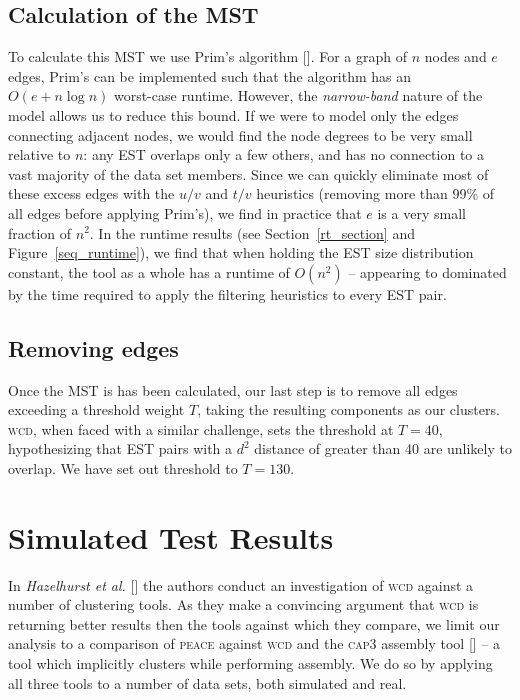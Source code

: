 \documentclass[a4paper,12pt]{article}
\begin{document}
\begin{appendix}
\subsection{Calculation of the MST}

To calculate this MST we use Prim's algorithm [\cite{Prim57}].  For a
graph of $n$ nodes and $e$ edges, Prim's can be implemented such that
the algorithm has an $O(e + n \log n)$ worst-case runtime.  However,
the {\it narrow-band} nature of the model allows us to reduce this
bound.  If we were to model only the edges connecting adjacent nodes,
we would find the node degrees to be very small relative to $n$: any
EST overlaps only a few others, and has no connection to a vast
majority of the data set members.  Since we can quickly eliminate most
of these excess edges with the $u/v$ and $t/v$ heuristics (removing
more than 99\% of all edges before applying Prim's), we find in
practice that $e$ is a very small fraction of $n^2$.  In the
runtime results (see Section~\ref{rt_section} and
Figure~\ref{seq_runtime}), we find that when holding the EST size
distribution constant, the tool as a whole has a runtime of $O(n^2)$
-- appearing to dominated by the time required to apply
the filtering heuristics to every EST pair.

\subsection{Removing edges}

Once the MST is has been calculated, our last step is to remove all
edges exceeding a threshold weight $T$, taking the resulting
components as our clusters.  \textsc{wcd}, when faced with a similar
challenge, sets the threshold at $T=40$, hypothesizing that EST pairs
with a $d^2$ distance of greater than 40 are unlikely to overlap.  We
have set out threshold to $T=130$.



\section{Simulated Test Results}

In {\it Hazelhurst et al.} [\cite{Hazelhurst08a}] the authors conduct
an investigation of \textsc{wcd} against a number of clustering
tools.  As they make a convincing argument that \textsc{wcd} is returning
better results then the tools against which they compare, we limit our
analysis to a comparison of \textsc{peace} against \textsc{wcd} and the \textsc{cap3} assembly
tool [\cite{Huang99}] -- a tool which implicitly clusters while
performing assembly.  We do so by applying all three tools to a number
of data sets, both simulated and real.


\end{appendix}
\end{document}
